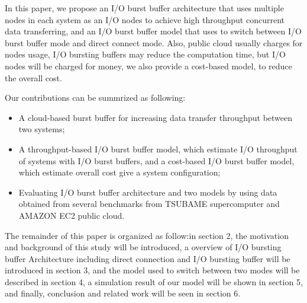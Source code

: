 In this paper, we propose an I/O burst buffer architecture that uses multiple nodes in each system as an I/O nodes 
to achieve high throughput concurrent data transferring, and an I/O burst buffer model 
that uses to switch between I/O burst buffer mode and direct connect mode.
Also, public cloud usually charges for nodes usage, I/O bursting buffers may reduce the computation time, 
but I/O nodes will be charged for money, we also provide a cost-based model, to reduce the overall cost.

Our contributions can be summrized as following:
\begin{itemize}
	\item A cloud-based burst buffer for increasing data transfer throughput between two systems;
	\item A throughput-based I/O burst buffer model, which estimate I/O throughput of systems with I/O burst buffers, and a cost-based I/O burst buffer model, which estimate overall cost give a system configuration;
        \item Evaluating I/O burst buffer architecture and two models by using data obtained from several benchmarks from TSUBAME supercomputer and AMAZON EC2 public cloud.
\end{itemize}
The remainder of this paper is organized as follow:in section 2, the motivation and background of this study will be introduced, a overview of I/O bursting buffer Architecture including direct connection and I/O bursting buffer will be introduced in section 3, and the model used to switch between two modes will be described in section 4, a simulation result of our model %
will be shown in section 5, and finally, conclusion and related work will be seen in section 6.

